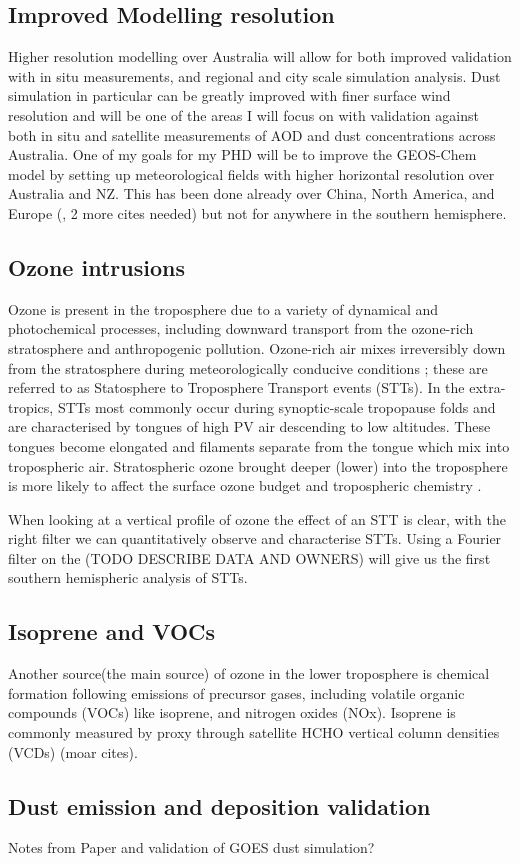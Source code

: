\subsection{Improved Modelling resolution}
Higher resolution modelling over Australia will allow for both improved validation with in situ measurements, and regional and city scale simulation analysis. 
Dust simulation in particular can be greatly improved with finer surface wind resolution and will be one of the areas I will focus on with validation against both in situ and satellite measurements of AOD and dust concentrations across Australia.
One of my goals for my PHD will be to improve the GEOS-Chem model by setting up meteorological fields with higher horizontal resolution over Australia and NZ.
This has been done already over China, North America, and Europe (\cite{Chen_2009}, 2 more cites needed) but not for anywhere in the southern hemisphere.

\subsection{Ozone intrusions}
Ozone is present in the troposphere due to a variety of dynamical and photochemical processes, including downward  transport from the ozone-rich stratosphere and anthropogenic pollution.
Ozone-rich air mixes irreversibly down from the stratosphere during meteorologically conducive conditions \citep{Sprenger2003,Mihalikova2012}; these are referred to as Statosphere to Troposphere Transport events (STTs). 
In the extra-tropics, STTs most commonly occur during synoptic-scale tropopause folds \citep{Sprenger2003} and are characterised by tongues of high PV air descending to low altitudes.
These tongues become elongated and filaments separate from the tongue which mix into tropospheric air.
Stratospheric ozone brought deeper (lower) into the troposphere is more likely to affect the surface ozone budget and tropospheric chemistry \citep{Zanis2003}.

When looking at a vertical profile of ozone the effect of an STT is clear, with the right filter we can quantitatively observe and characterise STTs.
Using a Fourier filter on the (TODO DESCRIBE DATA AND OWNERS) will give us the first southern hemispheric analysis of STTs.

\subsection{Isoprene and VOCs}
Another source(the main source) of ozone in the lower troposphere is chemical formation following emissions of precursor gases, including volatile organic compounds (VOCs) like isoprene, and nitrogen oxides (NOx).
Isoprene is commonly measured by proxy through satellite HCHO vertical column densities (VCDs) \cite{Marais_2012,bauwens2013satellite}(moar cites).

\subsection{Dust emission and deposition validation}
Notes from Paper and validation of GOES dust simulation?
  
  